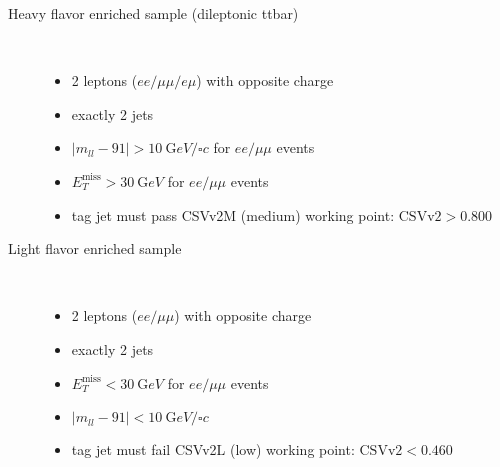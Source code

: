 \begin{description}
    \item[Heavy flavor enriched sample (dileptonic ttbar)]\ \\ %
    \begin{itemize}
        \item 2 leptons (\(ee/\mu\mu/e\mu{}\)) with opposite charge
        \item exactly 2 jets
        \item \(|m_{ll} - 91 | > \SI{10}{\giga eV \per \square c}\) for \(ee/\mu\mu{}\) events
        \item \(E_T^\text{miss} > \SI{30}{\giga eV}\) for \(ee/\mu\mu{}\) events
        \item tag jet must pass CSVv2M (medium) working point: \(\text{CSVv2} > 0.800\)
    \end{itemize}
    \item[Light flavor enriched sample]\ \\ %
    \begin{itemize}
        \item 2 leptons (\(ee/\mu\mu{}\)) with opposite charge
        \item exactly 2 jets
        \item \(E_T^\text{miss} < \SI{30}{\giga eV}\) for \(ee/\mu\mu{}\) events
        \item \(|m_{ll} - 91 | < \SI{10}{\giga eV \per \square c}\)
        \item tag jet must fail CSVv2L (low) working point: \(\text{CSVv2} < 0.460\)
    \end{itemize}
\end{description}
